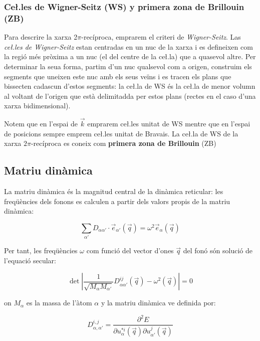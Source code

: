 \documentclass[12pt,twoside,a4paper]{article}%
\begin{document}
\subsubsection{Ce\l.les de Wigner-Seitz (WS) y primera zona de Brillouin (ZB)}
Para descrire la xarxa 2$\pi$-recíproca, emprarem el criteri de \textit{Wigner-Seitz}. Las \textit{ce\l.les de Wigner-Seitz} estan centradas en un nuc de la xarxa i es defineixen com la regió més pròxima a un nuc (el del centre de la ce\l.la) que a quasevol altre. Per determinar la seua forma, partim d'un nuc qualsevol com a origen, construim els segments que uneixen este nuc amb els seus veïns i es tracen els plans que bissecten cadascun d'estos segments: la ce\l.la de WS és la ce\l.la de menor volumn al voltant de l'origen que està delimitadda per estos plans (rectes en el caso d'una xarxa bidimensional).

Notem que en l'espai de $\vec k$ emprarem ce\l.les unitat de WS mentre que en l'espai de posicions sempre emprem ce\l.les unitat de Bravais.
La ce\l.la de WS de la xarxa $2\pi$-recíproca es coneix com \textbf{primera zona de Brillouin} (ZB)

\newpage
\subsection{Matriu dinàmica}

La matriu dinàmica és la magnitud central de la dinàmica reticular: les freqüències dels fonons es calculen a partir dels valors propis de la matriu dinàmica:

\begin{equation}
\sum_{\alpha\prime}D_{\alpha\alpha\prime}\cdot\vec e_{\alpha\prime}(\vec q)=\omega^{2}\vec e_{\alpha}(\vec q)
\end{equation}   

Per tant, les freqüències $\omega$ com funció del vector d'ones $\vec q$ del fonó són solució de l'equació secular:

\begin{equation}
\det\left|\frac{1}{\sqrt{M_\alpha M_{\alpha\prime}}}D^{ij}_{\alpha\alpha\prime}\left(\vec q\right)-\omega^2\left(\vec q\right)\right|=0 
\end{equation}

on $M_{\alpha}$ es la massa de l'àtom $\alpha$ y la matriu dinàmica ve definida por:

\begin{equation}
D_{\alpha,\alpha\prime}^{i,j}=\frac{\partial^2 E}{\partial u_{\alpha}^{*i}(\vec q)\partial u_{\alpha\prime}^{j}(\vec q)}
\label{eq:Matriz_Dinámica}
\end{equation}
\end{document}
